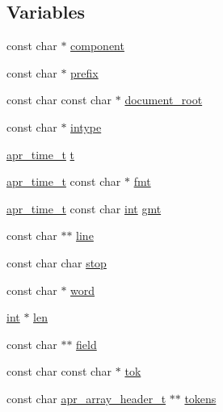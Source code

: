 \subsection*{Variables}
\begin{DoxyCompactItemize}
\item 
const char $\ast$ \hyperlink{group__APACHE__CORE__DAEMON_ga15f3129d47387a1e720de18aba5a23da}{component}
\item 
const char $\ast$ \hyperlink{group__APACHE__CORE__DAEMON_ga5b41c5ae4505891e6c53e26df197e02b}{prefix}
\item 
const char const char $\ast$ \hyperlink{group__APACHE__CORE__DAEMON_gae6d749c77cf53887e389fee88eabb8fb}{document\+\_\+root}
\item 
const char $\ast$ \hyperlink{group__APACHE__CORE__DAEMON_gac1bad7796d7e6bd090437027211b717a}{intype}
\item 
\hyperlink{group__apr__time_gadb4bde16055748190eae190c55aa02bb}{apr\+\_\+time\+\_\+t} \hyperlink{group__APACHE__CORE__DAEMON_gabfa74bb4f05f3b2de1a89160025e5400}{t}
\item 
\hyperlink{group__apr__time_gadb4bde16055748190eae190c55aa02bb}{apr\+\_\+time\+\_\+t} const char $\ast$ \hyperlink{group__APACHE__CORE__DAEMON_gacf53f259c50e76452489d799cd9f0e20}{fmt}
\item 
\hyperlink{group__apr__time_gadb4bde16055748190eae190c55aa02bb}{apr\+\_\+time\+\_\+t} const char \hyperlink{pcre_8txt_a42dfa4ff673c82d8efe7144098fbc198}{int} \hyperlink{group__APACHE__CORE__DAEMON_gac77770304e1e349b358dab7a42649d6f}{gmt}
\item 
const char $\ast$$\ast$ \hyperlink{group__APACHE__CORE__DAEMON_ga2a7a1aa13a4f14075411123a4495593c}{line}
\item 
const char char \hyperlink{group__APACHE__CORE__DAEMON_gaa77e95f4cc3a2a8eb69ef54ee72d4d2a}{stop}
\item 
const char $\ast$ \hyperlink{group__APACHE__CORE__DAEMON_gadc1f34651f7bbfa3ba5af27db5f53817}{word}
\item 
\hyperlink{pcre_8txt_a42dfa4ff673c82d8efe7144098fbc198}{int} $\ast$ \hyperlink{group__APACHE__CORE__DAEMON_ga342def50f5e27714b3779c796673b996}{len}
\item 
const char $\ast$$\ast$ \hyperlink{group__APACHE__CORE__DAEMON_gae5c4b068a26ad890b3f11ac8dc993347}{field}
\item 
const char const char $\ast$ \hyperlink{group__APACHE__CORE__DAEMON_gab250c55f81df5e1f93822c2bbcc84458}{tok}
\item 
const char \hyperlink{structapr__array__header__t}{apr\+\_\+array\+\_\+header\+\_\+t} $\ast$$\ast$ \hyperlink{group__APACHE__CORE__DAEMON_ga4b29dc6d812c1c567a7b51775ffdac64}{tokens}
$$
\end{DoxyCompactItemize}
